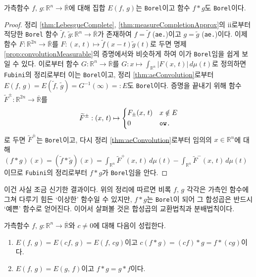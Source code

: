 \begin{theorem}\label{thm:convolutionBorel}
    가측함수 $f,\,g:\mathbb{R}^n\to\overline{\mathbb{R}}$에 대해 집합 $E(f,\,g)$는 \texttt{Borel}이고 함수 $f*g$도 \texttt{Borel}이다.
\end{theorem}

\begin{proof}
    정리 \ref{thm:LebesgueComplete}, \ref{thm:measureCompletionApprox}의 ii로부터 적당한 \texttt{Borel} 함수 $\widetilde{f},\,\widetilde{g}:\mathbb{R}^n\to\overline{\mathbb{R}}$가 존재하여 $f=\widetilde{f}$ (\texttt{ae.})이고 $g=\widetilde{g}$ (\texttt{ae.})이다. 이제 함수 $F:\mathbb{R}^{2n}\to\overline{\mathbb{R}}$를 $F:(x,\,t)\mapsto\widetilde{f}(x-t)\widetilde{g}(t)$로 두면 명제 \ref{prop:convolutionMeasurable}의 증명에서와 비슷하게 하여 이가 \texttt{Borel}임을 쉽게 보일 수 있다. 이로부터 함수 $G:\mathbb{R}^n\to\overline{\mathbb{R}}$를 $G:x\mapsto\int_{\mathbb{R}^n}|F(x,\,t)|\,d\mu(t)$로 정의하면 \texttt{Fubini}의 정리로부터 이는 \texttt{Borel}이고, 정리 \ref{thm:aeConvolution}로부터 $E(f,\,g)=E(\widetilde{f},\,\widetilde{g})=G^{-1}(\infty)=:E$도 \texttt{Borel}이다. 증명을 끝내기 위해 함수 $\widetilde{F}^\pm:\mathbb{R}^{2n}\to\overline{\mathbb{R}}$를
    \begin{equation*}
        \widetilde{F}^\pm:(x,\,t)\mapsto
        \begin{dcases*}
            F_\pm(x,\,t)&$x\notin E$\\
            0&\texttt{ow.}
        \end{dcases*}
    \end{equation*}
    로 두면 $\widetilde{F}^\pm$는 \texttt{Borel}이고, 다시 정리 \ref{thm:aeConvolution}로부터 임의의 $x\in\mathbb{R}^n$에 대해 $(f*g)(x)=(\widetilde{f}*\widetilde{g})(x)=\int_{\mathbb{R}^n}\widetilde{F}^+(x,\,t)\,d\mu(t)-\int_{\mathbb{R}^n}\widetilde{F}^-(x,\,t)\,d\mu(t)$이므로 \texttt{Fubini}의 정리로부터 $f*g$가 \texttt{Borel}임을 안다.
\end{proof}

이건 사실 조금 신기한 결과이다. 위의 정리에 따르면 비록 $f,\,g$ 각각은 가측인 함수에 그쳐 다루기 힘든 `이상한' 함수일 수 있지만, $f*g$는 \texttt{Borel}이 되어 그 합성곱은 반드시 `예쁜' 함수로 얻어진다. 이어서 살펴볼 것은 합성곱의 교환법칙과 분배법칙이다.

\begin{theorem}\label{thm:convolutionCommut}
    가측함수 $f,\,g:\mathbb{R}^n\to\overline{\mathbb{R}}$와 $c\ne0$에 대해 다음이 성립한다.
    \begin{enumerate}
        \item $E(f,\,g)=E(cf,\,g)=E(f,\,cg)$이고 $c(f*g)=(cf)*g=f*(cg)$이다.
        \item $E(f,\,g)=E(g,\,f)$이고 $f*g=g*f$이다.
    \end{enumerate}
\end{theorem}

